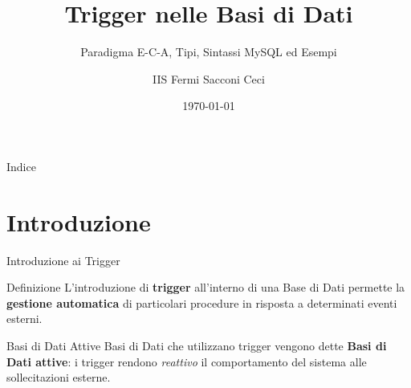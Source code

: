 \documentclass[aspectratio=169]{beamer}
\title[Trigger SQL]{Trigger nelle Basi di Dati}
\subtitle{Paradigma E-C-A, Tipi, Sintassi MySQL ed Esempi}
\author{IIS Fermi Sacconi Ceci}
\institute{Prof. Fedeli Massimo -- Basi di Dati}
\date{\today}
\begin{document}
\begin{frame}
  \titlepage
\end{frame}

\begin{frame}{Indice}
  \tableofcontents
\end{frame}

\section{Introduzione}

\begin{frame}{Introduzione ai Trigger}
  \begin{block}{Definizione}
    L'introduzione di \textbf{trigger} all'interno di una Base di Dati permette
    la \textbf{gestione automatica} di particolari procedure in risposta a
    determinati eventi esterni.
  \end{block}

  \vspace{0.4cm}
  \begin{alertblock}{Basi di Dati Attive}
    Basi di Dati che utilizzano trigger vengono dette \textbf{Basi di Dati attive}:
    i trigger rendono \emph{reattivo} il comportamento del sistema alle
    sollecitazioni esterne.
  \end{alertblock}

  \vspace{0.3cm}
\end{frame}
\end{document}
